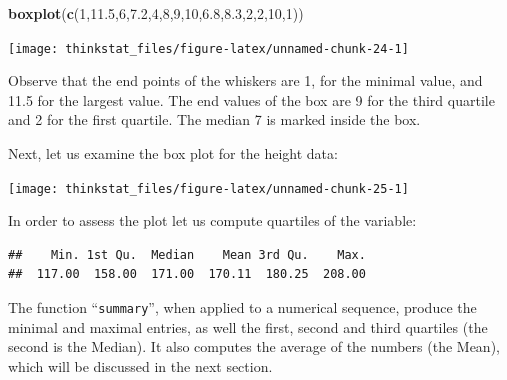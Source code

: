 \documentclass[]{krantz}
\makeatletter
\newenvironment{Shaded}{\begin{snugshade}}{\end{snugshade}}
\newcommand{\KeywordTok}[1]{\textcolor[rgb]{0.13,0.29,0.53}{\textbf{#1}}}
\newcommand{\DecValTok}[1]{\textcolor[rgb]{0.00,0.00,0.81}{#1}}
\newcommand{\FloatTok}[1]{\textcolor[rgb]{0.00,0.00,0.81}{#1}}
\newcommand{\OperatorTok}[1]{\textcolor[rgb]{0.81,0.36,0.00}{\textbf{#1}}}
\newcommand{\NormalTok}[1]{#1}
\newenvironment{kframe}{%
\medskip{}
\setlength{\fboxsep}{.8em}
 \def\at@end@of@kframe{}%
 \ifinner\ifhmode%
  \def\at@end@of@kframe{\end{minipage}}%
  \begin{minipage}{\columnwidth}%
 \fi\fi%
 \def\FrameCommand##1{\hskip\@totalleftmargin \hskip-\fboxsep
 \colorbox{shadecolor}{##1}\hskip-\fboxsep
     \hskip-\linewidth \hskip-\@totalleftmargin \hskip\columnwidth}%
 \MakeFramed {\advance\hsize-\width
   \@totalleftmargin\z@ \linewidth\hsize
   \@setminipage}}%
 {\par\unskip\endMakeFramed%
 \at@end@of@kframe}
\renewenvironment{Shaded}{\begin{kframe}}{\end{kframe}}
\theoremstyle{definition}
\theoremstyle{definition}
\theoremstyle{definition}
\theoremstyle{remark}
\makeatother
\begin{document}
\begin{Shaded}
\begin{Highlighting}[]
\KeywordTok{boxplot}\NormalTok{(}\KeywordTok{c}\NormalTok{(}\DecValTok{1}\NormalTok{,}\FloatTok{11.5}\NormalTok{,}\DecValTok{6}\NormalTok{,}\FloatTok{7.2}\NormalTok{,}\DecValTok{4}\NormalTok{,}\DecValTok{8}\NormalTok{,}\DecValTok{9}\NormalTok{,}\DecValTok{10}\NormalTok{,}\FloatTok{6.8}\NormalTok{,}\FloatTok{8.3}\NormalTok{,}\DecValTok{2}\NormalTok{,}\DecValTok{2}\NormalTok{,}\DecValTok{10}\NormalTok{,}\DecValTok{1}\NormalTok{))}
\end{Highlighting}
\end{Shaded}

\begin{center}\texttt{[image: thinkstat\_files/figure-latex/unnamed-chunk-24-1]} \end{center}

Observe that the end points of the whiskers are 1, for the minimal
value, and 11.5 for the largest value. The end values of the box are 9
for the third quartile and 2 for the first quartile. The median 7 is
marked inside the box.

Next, let us examine the box plot for the height data:

\begin{Shaded}
\end{Shaded}

\begin{center}\texttt{[image: thinkstat\_files/figure-latex/unnamed-chunk-25-1]} \end{center}

In order to assess the plot let us compute quartiles of the variable:

\begin{Shaded}
\end{Shaded}

\begin{verbatim}
##    Min. 1st Qu.  Median    Mean 3rd Qu.    Max. 
##  117.00  158.00  171.00  170.11  180.25  208.00
\end{verbatim}

The function ``\texttt{summary}'', when applied to a numerical sequence,
produce the minimal and maximal entries, as well the first, second and
third quartiles (the second is the Median). It also computes the average
of the numbers (the Mean), which will be discussed in the next section.
\end{document}
